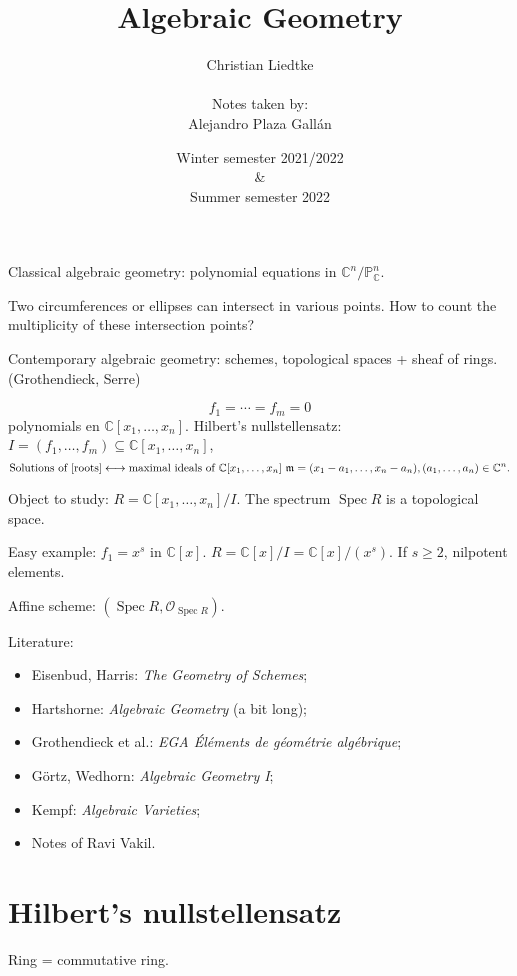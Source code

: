 \documentclass[12pt]{article}
\title{Algebraic Geometry}
\author{Christian Liedtke\\\\Notes taken by:\\Alejandro Plaza Gall\'{a}n}
\date{Winter semester 2021/2022\\\&\\ Summer semester 2022}
\DeclareMathOperator{\Spec}{Spec}
\theoremstyle{definition}
\theoremstyle{remark}
\begin{document}
\maketitle
\tableofcontents
\newpage

Classical algebraic geometry: polynomial equations in $\mathbb{C}^n/\mathbb{P}_{\mathbb{C}}^n$.

Two circumferences or ellipses can intersect in various points. How to count the multiplicity of these intersection points?

Contemporary algebraic geometry: schemes, topological spaces + sheaf of rings. (Grothendieck, Serre)

\begin{equation}\tag{$*$}\label{roots}
f_1=\cdots=f_m=0
\end{equation}
polynomials en $\mathbb{C}[x_1,\ldots,x_n]$. Hilbert's nullstellensatz: $I=(f_1,\ldots,f_m)\subseteq\mathbb{C}[x_1,\ldots,x_n]$,
\[\text{Solutions of \eqref{roots}}\longleftrightarrow\text{maximal ideals of }\mathbb{C}[x_1,\ldots,x_n]\ \mathfrak{m}=(x_1-a_1,\ldots,x_n-a_n),(a_1,\ldots,a_n)\in\mathbb{C}^n.\]

Object to study: $R=\mathbb{C}[x_1,\ldots,x_n]/I$. The spectrum $\Spec R$ is a topological space.

Easy example: $f_1=x^s$ in $\mathbb{C}[x]$. $R=\mathbb{C}[x]/I=\mathbb{C}[x]/(x^s)$. If $s\geq2$, nilpotent elements.

Affine scheme: $(\Spec R,\mathcal{O}_{\Spec R})$.

Literature:
\begin{itemize}
\item[\cite{eisenbud2006geometry}] Eisenbud, Harris: \emph{The Geometry of Schemes};
\item[\cite{hartshorne2013algebraic}] Hartshorne: \emph{Algebraic Geometry} (a bit long);
\item[\cite{dieudonne1971elements}] Grothendieck et al.: \emph{EGA \'{E}l\'{e}ments de g\'{e}om\'{e}trie alg\'{e}brique};
\item[\cite{gortz2010algebraic}] G\"{o}rtz, Wedhorn: \emph{Algebraic Geometry I};
\item[\cite{kempf1993algebraic}] Kempf: \emph{Algebraic Varieties};
\item[\cite{vakil2006foundations}] Notes of Ravi Vakil.
\end{itemize}

\section{Hilbert's nullstellensatz}
Ring = commutative ring.
\end{document}

